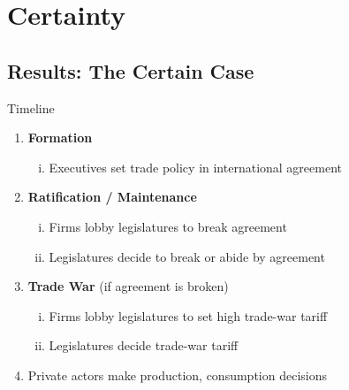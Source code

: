 \documentclass[handout]{beamer}
\begin{document}
\section{Certainty}
\subsection{Results: The Certain Case}
\begin{frame}{Timeline}
\begin{enumerate}
	\item \textbf{Formation}
		\begin{enumerate}[i.]
			\item Executives set trade policy in international agreement
		\end{enumerate}
	\item \textbf{Ratification / Maintenance}
		\begin{enumerate}[i.]
			\item Firms lobby legislatures to break agreement
			\item Legislatures decide to break or abide by agreement
		\end{enumerate}
	\item {\color{gray} \textbf{Trade War} (if agreement is broken)}
		\begin{enumerate}[i.]
			\item {\color{gray} Firms lobby legislatures to set high trade-war tariff}
			\item {\color{gray} Legislatures decide trade-war tariff}
		\end{enumerate}
	\item {\color{gray} Private actors make production, consumption decisions}
\end{enumerate}
\end{frame}
\end{document}
